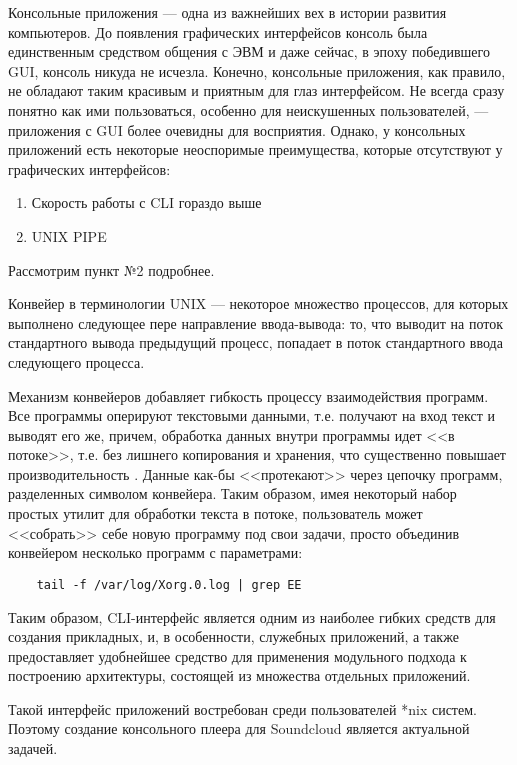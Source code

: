 Консольные приложения --- одна из важнейших вех в истории развития
компьютеров. До появления графических интерфейсов консоль была
единственным средством общения с ЭВМ и даже сейчас, в эпоху победившего GUI,
консоль никуда не исчезла. Конечно, консольные приложения, как
правило,  не обладают таким красивым и приятным для глаз интерфейсом.
Не  всегда сразу понятно как ими пользоваться, особенно для неискушенных
пользователей, --- приложения с GUI более очевидны для восприятия. Однако, у
консольных приложений есть некоторые неоспоримые
преимущества, которые отсутствуют у графических интерфейсов:

\begin{enumerate}
\item{Скорость работы с CLI гораздо выше}
\item{UNIX PIPE}
\end{enumerate}

Рассмотрим пункт №2 подробнее.

Конвейер в терминологии UNIX — некоторое множество процессов, для
которых выполнено следующее пере направление ввода-вывода: то, что
выводит на поток стандартного вывода предыдущий процесс, попадает в
поток стандартного ввода следующего процесса.

Механизм конвейеров добавляет гибкость процессу взаимодействия программ.
Все программы оперируют текстовыми данными, т.е. получают на вход текст и
выводят его же, причем, обработка данных внутри программы идет <<в
потоке>>, т.е. без лишнего копирования и хранения, что существенно
повышает производительность \cite{habr:gulp}. Данные как-бы <<протекают>>  через
цепочку программ, разделенных символом конвейера. Таким образом, имея
некоторый набор простых утилит для обработки текста в потоке,
пользователь может <<собрать>> себе новую программу под свои задачи,
просто объединив конвейером несколько программ с параметрами: 

\begin{lstlisting}
    tail -f /var/log/Xorg.0.log | grep EE
\end{lstlisting}

Таким образом, CLI-интерфейс является одним из наиболее гибких средств для
создания прикладных, и, в особенности, служебных приложений, а также предоставляет
удобнейшее средство для применения модульного подхода к построению
архитектуры, состоящей из множества отдельных приложений.

Такой интерфейс приложений востребован среди пользователей *nix систем. Поэтому
создание консольного плеера для Soundcloud является актуальной
задачей. 
